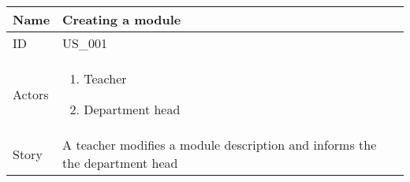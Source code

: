 \documentclass{article}
\newcommand\addrow[2]{#1 &#2\\ }
\newcommand\tabularhead{\begin{tabular}{lp{8cm}}
		\hline
	}
\newcommand\addmulrow[2]{ \begin{minipage}[t][][t]{2.5cm}#1\end{minipage}%
		&\begin{minipage}[t][][t]{8cm}
			\begin{enumerate} #2   \end{enumerate}
		\end{minipage}\\ }
\newenvironment{usecase}{\tabularhead}
	{\hline\end{tabular}}
\begin{document}
	\begin{usecase}
		\addrow{Name}{Creating a module}
		\hline
		\addrow{ID}{US\_001}
		\hline
 		\addmulrow{Actors}{	\item Teacher 
							\item Department head }
		\hline		
		\addrow{Story}{A teacher modifies a module description and informs the the department head}
								

	\end{usecase}
	
\end{document}
